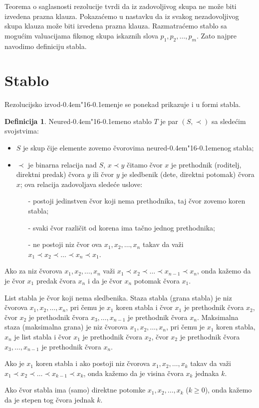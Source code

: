 \documentclass[12pt, a4paper, titlepage, twoside]{article}
\theoremstyle{definition}
\newtheorem{defn}[theorem]{Definicija}
\def\dj{d\kern-0.4em\char"16\kern-0.1em}
\begin{document}
Teorema o saglasnosti rezolucije tvrdi da iz zadovoljivog skupa ne mo\v ze
biti izvedena prazna klauza. Pokaza\'cemo u nastavku da iz svakog nezadovoljivog
skupa klauza mo\v ze biti izvedena prazna klauza. Razmatra\'cemo stablo
sa mogu\'cim va\-lua\-ci\-ja\-ma fiksnog skupa iskaznih slova ${p_1, p_2,\dots , p_m}$.
Zato najpre navodimo definiciju stabla.

\vspace{1cm}
\section{Stablo}
\vspace{1cm}
Rezolucijsko izvo\dj{}enje se ponekad prikazuje i u formi stabla.
\begin{defn}
Neure\dj{}eno stablo $T$ je par $(S, \prec)$ sa slede\'cim svojstvima:
\begin{itemize}
	\item $S$ je skup \v cije elemente zovemo \v cvorovima neure\dj{}enog stabla;
	\item $\prec$ je binarna relacija nad $S$, $x \prec y$ \v citamo \v cvor $x$ je prethodnik
(roditelj, direktni predak) \v cvora $y$ ili \v cvor $y$ je sledbenik (dete, direktni potomak)
\v cvora $x$; ova relacija zadovoljava slede\'ce uslove:
\begin{itemize}
	\item[-] postoji jedinstven \v cvor koji nema prethodnika, taj \v cvor zovemo koren
stabla;
	\item[-] svaki \v cvor razli\v cit od korena ima ta\v cno jednog prethodnika;
	\item[-] ne postoji niz \v cvor ova $x_1, x_2, \dots , x_n$ takav da va\v zi 
$x_1 \prec x_2 \prec \dots \prec x_n \prec x_1$.
\end{itemize}
\end{itemize}


Ako za niz \v cvorova $x_1, x_2,\dots, x_n$ va\v zi 
$x_1 \prec x_2 \prec \dots \prec x_{n-1} \prec x_n$, 
onda ka\v zemo da je \v cvor $x_1$ predak \v cvora $x_n$ i da je \v cvor $x_n$ 
potomak \v cvora $x_1$.


List stabla je  \v cvor koji nema sledbenika. Staza stabla (grana stabla) je 
niz \v cvorova $x_1, x_2, \dots , x_n$, pri  \v cemu je $x_1$ koren stabla i  \v cvor $x_1$ je 
prethodnik \v cvora $x_2$, \v cvor $x_2$ je prethodnik \v cvora $x_3,\dots,x_{n-1}$ je 
prethodnik  \v cvora $x_n$. Maksimalna staza (maksimalna grana) je niz  \v cvorova 
$x_1, x_2,\dots , x_n$, pri  \v cemu je $x_1$ koren stabla, $x_n$ je list stabla 
i  \v cvor $x_1$ je prethodnik \v cvora $x_2$, \v cvor $x_2$ je prethodnik  \v cvora 
$x_3,\dots,x_{n-1}$ je prethodnik \v cvora $x_n$.


Ako je $x_1$ koren stabla i ako postoji niz  \v cvorova $x_1, x_2,\dots,x_k$ takav da va\v zi
$x_1 \prec x_2 \prec \dots \prec x_{k-1} \prec x_k$, onda ka\v zemo da je visina  
\v cvora $x_k$ jednaka $k$.


Ako  \v cvor stabla ima (samo) direktne potomke $x_1, x_2, \dots , x_k$ ($k \geq 0$), onda
ka\v zemo da je stepen tog  \v cvora jednak $k$.
\end{defn}
\end{document}
